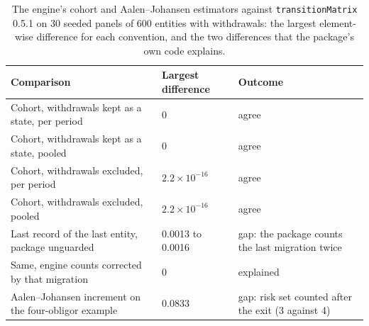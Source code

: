 \begin{table}[htbp]
\centering
\small
\caption{The engine's cohort and Aalen--Johansen estimators against \texttt{transitionMatrix} 0.5.1 on 30 seeded panels of 600 entities with withdrawals: the largest element-wise difference for each convention, and the two differences that the package's own code explains.}
\label{tab:transition-matrix}
\begin{tabular}{p{6.3cm}p{2.8cm}p{5.2cm}}
\toprule
Comparison & Largest difference & Outcome \\
\midrule
Cohort, withdrawals kept as a state, per period & $0$ & agree \\
Cohort, withdrawals kept as a state, pooled & $0$ & agree \\
Cohort, withdrawals excluded, per period & $2.2\times10^{-16}$ & agree \\
Cohort, withdrawals excluded, pooled & $2.2\times10^{-16}$ & agree \\
Last record of the last entity, package unguarded & 0.0013 to 0.0016 & gap: the package counts the last migration twice \\
Same, engine counts corrected by that migration & $0$ & explained \\
Aalen--Johansen increment on the four-obligor example & 0.0833 & gap: risk set counted after the exit (3 against 4) \\
\bottomrule
\end{tabular}
\end{table}
